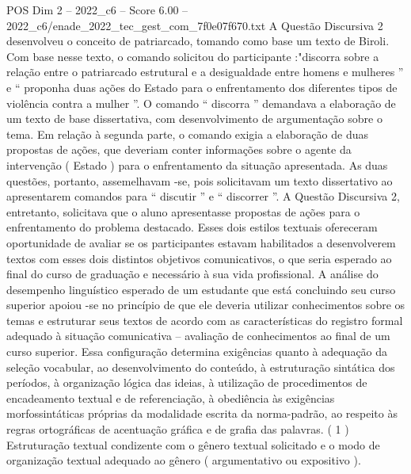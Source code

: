 \begin{textsample}{POS Dim 2 – 2022\_c6 – Score 6.00 – 2022\_c6/enade\_2022\_tec\_gest\_com\_7f0e07f670.txt}
A Questão Discursiva 2 desenvolveu o conceito de patriarcado, tomando como base um texto de Biroli.
Com base nesse texto, o comando solicitou do participante :"discorra sobre a relação entre o patriarcado estrutural e a desigualdade entre homens e mulheres ” e “ proponha duas ações do Estado para o enfrentamento dos diferentes tipos de violência contra a mulher ”.
O comando “ discorra ” demandava a elaboração de um texto de base dissertativa, com desenvolvimento de argumentação sobre o tema.
Em relação à segunda parte, o comando exigia a elaboração de duas propostas de ações, que deveriam conter informações sobre o agente da intervenção ( Estado ) para o enfrentamento da situação apresentada.
As duas questões, portanto, assemelhavam -se, pois solicitavam um texto dissertativo ao apresentarem comandos para “ discutir ” e “ discorrer ”.
A Questão Discursiva 2, entretanto, solicitava que o aluno apresentasse propostas de ações para o enfrentamento do problema destacado.
Esses dois estilos textuais ofereceram oportunidade de avaliar se os participantes estavam habilitados a desenvolverem textos com esses dois distintos objetivos comunicativos, o que seria esperado ao final do curso de graduação e necessário à sua vida profissional.
A análise do desempenho linguístico esperado de um estudante que está concluindo seu curso superior apoiou -se no princípio de que ele deveria utilizar conhecimentos sobre os temas e estruturar seus textos de acordo com as características do registro formal adequado à situação comunicativa – avaliação de conhecimentos ao final de um curso superior.
Essa configuração determina exigências quanto à adequação da seleção vocabular, ao desenvolvimento do conteúdo, à estruturação sintática dos períodos, à organização lógica das ideias, à utilização de procedimentos de encadeamento textual e de referenciação, à obediência às exigências morfossintáticas próprias da modalidade escrita da norma-padrão, ao respeito às regras ortográficas de acentuação gráfica e de grafia das palavras. ( 1 ) Estruturação textual condizente com o gênero textual solicitado e o modo de organização textual adequado ao gênero ( argumentativo ou expositivo ).

\end{textsample}
